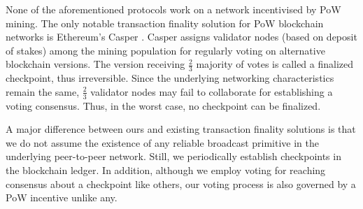 None of the aforementioned protocols work on a network incentivised by PoW mining. The only notable transaction finality solution for PoW blockchain networks is Ethereum's Casper \cite{casper}. Casper assigns validator nodes (based on deposit of stakes) among the mining population for regularly voting on alternative blockchain versions. The version receiving $\frac{2}{3}$ majority of votes is called a finalized checkpoint, thus irreversible. Since the underlying networking characteristics remain the same, $\frac{2}{3}$ validator nodes may fail to collaborate for establishing a voting consensus. Thus, in the worst case, no checkpoint can be finalized.                

A major difference between ours and existing transaction finality solutions is that we do not assume the existence of any reliable broadcast primitive in the underlying peer-to-peer network. Still, we periodically establish checkpoints in the blockchain ledger. In addition, although we employ voting for reaching consensus about a checkpoint like others, our voting process is also governed by a PoW incentive unlike any. 